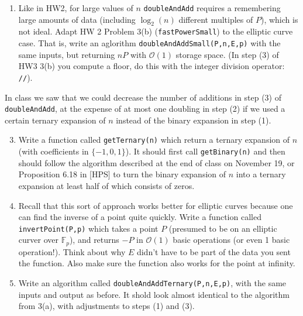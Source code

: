 \documentclass[11pt]{article}
\newcommand{\bF}{\mathbb{F}}
\newcommand{\cO}{\mathcal{O}}
\begin{document}
\begin{enumerate}
{\begin{enumerate}
{    \begin{enumerate}[(1)]
      \item{Compute the binary expansion $[n_0,n_1,\cdots,n_r]$ of $n$.}
      \item{Compute $Q_i = 2^iP\in E(\bF_p)$ for $0\le i\le r$ by successive doubling.  (Notice that $Q_{i+1} = 2Q_i$)}
      \item{Compute $nP = n_0Q_0 + n_1Q_1 + \cdots + n_rQ_r\in E(\bF_p)$ in at most $r$ additions.}
    \end{enumerate}
    }
    \item{
    Like in HW2, for large values of $n$ \verb|doubleAndAdd| requires a remembering large amounts of data (including $\log_2(n)$ different multiples of $P$), which is not ideal.  Adapt HW 2 Problem 3(b) (\verb|fastPowerSmall|) to the elliptic curve case.  That is, write an aglorithm \verb|doubleAndAddSmall(P,n,E,p)| with the same inputs, but returning $nP$ with $\cO(1)$ storage space.  (In step (3) of HW3 3(b) you compute a floor, do this with the integer division operator: \verb|//|).
    }
  \end{enumerate}
  In class we saw that we could decrease the number of additions in step (3) of \verb|doubleAndAdd|, at the expense of at most one doubling in step (2) if we used a certain ternary expansion of $n$ instead of the binary expansion in step (1).
  \begin{enumerate}
    \setcounter{enumii}{2}
    \item{
    Write a function called \verb|getTernary(n)| which return a ternary expansion of $n$ (with coefficients in $\{-1,0,1\}$).  It should first call \verb|getBinary(n)| and then should follow the algorithm described at the end of class on November 19, or Proposition 6.18 in [HPS] to turn the binary expansion of $n$ into a ternary expansion at least half of which consists of zeros.
    }
    \item{
    Recall that this sort of approach works better for elliptic curves because one can find the inverse of a point quite quickly.  Write a function called \verb|invertPoint(P,p)| which takes a point $P$ (presumed to be on an elliptic curver over $\bF_p$), and returns $-P$ in $\cO(1)$ basic operations (or even 1 basic operation!).  Think about why $E$ didn't have to be part of the data you sent the function.  Also make sure the function also works for the point at infinity.
    }
    \item{
    Write an algorithm called \verb|doubleAndAddTernary(P,n,E,p)|, with the same inputs and output as before.  It shold look almost identical to the algorithm from 3(a), with adjustments to steps (1) and (3).
}
\end{enumerate}}
\end{enumerate}
\end{document}
